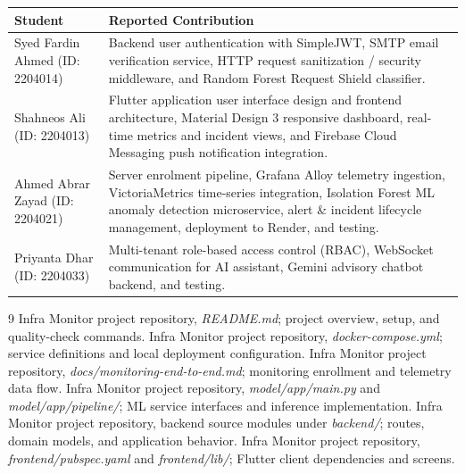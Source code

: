 \documentclass[12pt,a4paper,oneside]{report}
\begin{document}
\begin{titlepage}
\vspace{1.0cm}
\begin{tabularx}{0.95\textwidth}{p{} X}
\toprule
\textbf{Student} & \textbf{Reported Contribution}\\
\midrule
Syed Fardin Ahmed \newline(ID: 2204014) &
  Backend user authentication with SimpleJWT, SMTP email verification service, HTTP request sanitization / security middleware, and Random Forest Request Shield classifier.\\
\addlinespace[4pt]
Shahneos Ali \newline(ID: 2204013) &
  Flutter application user interface design and frontend architecture, Material Design 3 responsive dashboard, real-time metrics and incident views, and Firebase Cloud Messaging push notification integration.\\
\addlinespace[4pt]
Ahmed Abrar Zayad \newline(ID: 2204021) &
  Server enrolment pipeline, Grafana Alloy telemetry ingestion, VictoriaMetrics time-series integration, Isolation Forest ML anomaly detection microservice, alert \& incident lifecycle management, deployment to Render, and testing.\\
\addlinespace[4pt]
Priyanta Dhar \newline(ID: 2204033) &
  Multi-tenant role-based access control (RBAC), WebSocket communication for AI assistant, Gemini advisory chatbot backend, and testing.\\
\bottomrule
\end{tabularx}
\vfill
\end{titlepage}

\tableofcontents
\clearpage
{}







\begin{thebibliography}{9}
Infra Monitor project repository, \emph{README.md}; project overview, setup, and quality-check commands.
Infra Monitor project repository, \emph{docker-compose.yml}; service definitions and local deployment configuration.
Infra Monitor project repository, \emph{docs/monitoring-end-to-end.md}; monitoring enrollment and telemetry data flow.
Infra Monitor project repository, \emph{model/app/main.py} and \emph{model/app/pipeline/}; ML service interfaces and inference implementation.
Infra Monitor project repository, backend source modules under \emph{backend/}; routes, domain models, and application behavior.
Infra Monitor project repository, \emph{frontend/pubspec.yaml} and \emph{frontend/lib/}; Flutter client dependencies and screens.
\end{thebibliography}
\end{document}
